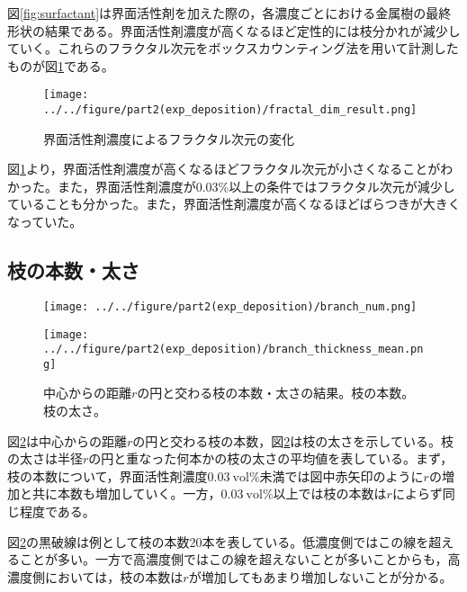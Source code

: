 \documentclass[autodetect-engine,dvi=dvipdfmx,a4paper,ja=standard,oneside,openany,11pt]{bxjsbook}
\begin{document}
図\ref{fig:surfactant}は界面活性剤を加えた際の，各濃度ごとにおける金属樹の最終形状の結果である。界面活性剤濃度が高くなるほど定性的には枝分かれが減少していく。これらのフラクタル次元をボックスカウンティング法を用いて計測したものが図\ref{fig:fractal_dim}である。

\begin{figure}[htbp]
  \centering
  \texttt{[image: ../../figure/part2(exp\_deposition)/fractal\_dim\_result.png]}
  \caption{界面活性剤濃度によるフラクタル次元の変化}
  \label{fig:fractal_dim}
\end{figure}

図\ref{fig:fractal_dim}より，界面活性剤濃度が高くなるほどフラクタル次元が小さくなることがわかった。また，界面活性剤濃度が0.03\%以上の条件ではフラクタル次元が減少していることも分かった。また，界面活性剤濃度が高くなるほどばらつきが大きくなっていた。

\subsection{枝の本数・太さ}

\begin{figure}[htbp]
  \begin{minipage}
    {0.45\textwidth}
    \subcaption{}
    \centering
    \texttt{[image: ../../figure/part2(exp\_deposition)/branch\_num.png]}
    \label{fig:branch_number}
  \end{minipage}
  \begin{minipage}
    {0.45\textwidth}
    \subcaption{}
    \centering
    \texttt{[image: ../../figure/part2(exp\_deposition)/branch\_thickness\_mean.png]}
    \label{fig:branch_thickness}
  \end{minipage}
  \caption{中心からの距離$r$の円と交わる枝の本数・太さの結果。枝の本数。枝の太さ。}
  \label{fig:branch}
\end{figure}

図\ref{fig:branch}は中心からの距離$r$の円と交わる枝の本数，図\ref{fig:branch}は枝の太さを示している。枝の太さは半径$r$の円と重なった何本かの枝の太さの平均値を表している。まず，枝の本数について，界面活性剤濃度$\SI{0.03}{\mathrm{vol}\%}$未満では図中赤矢印のように$r$の増加と共に本数も増加していく。一方，$\SI{0.03}{\mathrm{vol}\%}$以上では枝の本数は$r$によらず同じ程度である。

図\ref{fig:branch}の黒破線は例として枝の本数20本を表している。低濃度側ではこの線を超えることが多い。一方で高濃度側ではこの線を超えないことが多いことからも，高濃度側においては，枝の本数は$r$が増加してもあまり増加しないことが分かる。
\end{document}
